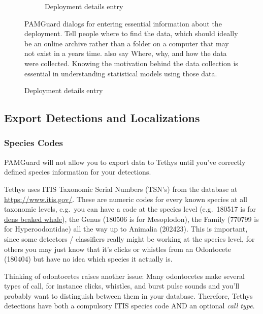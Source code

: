 \documentclass[
]{article}
\begin{document}
\begin{figure}
\begin{minipage}{0.50\linewidth}
\begin{figure}[H]
{}

\caption{\label{fig-deploymethod}Deployment details entry}

\end{figure}%

\end{minipage}%
\newline
\begin{minipage}{0.50\linewidth}
PAMGuard dialogs for entering essential information about the
deployment. Tell people where to find the data, which should ideally be
an online archive rather than a folder on a computer that may not exist
in a years time. also say Where, why, and how the data were collected.
Knowing the motivation behind the data collection is essential in
understanding statistical models using those data.\end{minipage}%

\end{figure}%

\subsection{Export Detections and
Localizations}\label{export-detections-and-localizations}

\subsubsection{Species Codes}\label{species-codes}

PAMGuard will not allow you to export data to Tethys until you've
correctly defined species information for your detections.

Tethys uses ITIS Taxonomic Serial Numbers (TSN's) from the database at
\url{https://www.itis.gov/}. These are numeric codes for every known
species at all taxonomic levels, e.g.~you can have a code at the species
level (e.g.~180517 is for
\href{https://www.itis.gov/servlet/SingleRpt/SingleRpt?search_topic=TSN&search_value=180517\#null}{dens
beaked whale}), the Genus (180506 is for Mesoplodon), the Family (770799
is for Hyperoodontidae) all the way up to Animalia (202423). This is
important, since some detectors / classifiers really might be working at
the species level, for others you may just know that it's clicks or
whistles from an Odontocete (180404) but have no idea which species it
actually is.

Thinking of odontocetes raises another issue: Many odontocetes make
several types of call, for instance clicks, whistles, and burst pulse
sounds and you'll probably want to distinguish between them in your
database. Therefore, Tethys detections have both a compulsory ITIS
species code AND an optional \emph{call type}.
\end{document}
